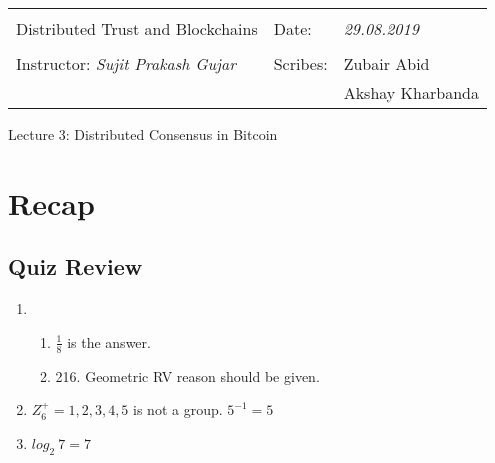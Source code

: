\documentclass[10pt,a4paper]{article}
\begin{document}
\begin{table}[!h]
\centering
\begin{tabularx}{\textwidth}{|Xll|}
\hline
& &\\
Distributed Trust and Blockchains &  Date: & \emph{29.08.2019}\\
 & &\\
Instructor: \emph{Sujit Prakash Gujar} & Scribes: & {Zubair Abid}\\ & & {Akshay Kharbanda} \\ 
 \hline

\end{tabularx}
\end{table}

\begin{center}
\begin{LARGE}
Lecture 3: Distributed Consensus in Bitcoin
\end{LARGE}
\end{center}


\section{Recap}
\subsection{Quiz Review}
\begin{enumerate}
    \item \begin{enumerate}
        \item  $\frac{1}{8}$ is the answer.
        
        \item 216. Geometric RV reason should be given.
    \end{enumerate}
    
    \item $Z^+_6 = {1, 2, 3, 4, 5}$ is not a group. $5^{-1} = 5$
    
    \item $log_2 \ 7 = 7$
\end{enumerate}
\end{document}
